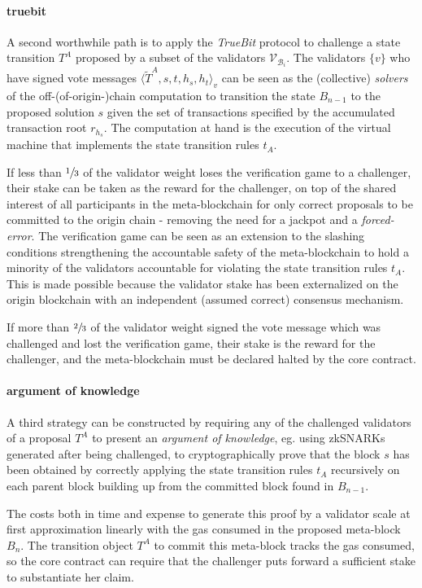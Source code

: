 \documentclass[12pt,a4paper]{article}
\begin{document}
\paragraph{truebit} A second worthwhile path is to apply the \textit{TrueBit}\cite{truebit} protocol to challenge a state transition $T^A$ proposed by a subset of the validators $\mathcal{V}_{\mathcal{B}_i}$.
The validators $\{v\}$ who have signed vote messages $\langle\tilde{T}^A, s, t, h_s, h_t\rangle_v$ can be seen as the (collective) \emph{solvers} of the off-(of-origin-)chain computation to transition the state $B_{n-1}$ to the proposed solution $s$ given the set of transactions specified by the accumulated transaction root $r_{h_s}$.
The computation at hand is the execution of the virtual machine that implements the state transition rules $t_A$.

If less than $\sfrac{1}{3}$ of the validator weight loses the verification game to a challenger, their stake can be taken as the reward for the challenger, on top of the shared interest of all participants in the meta-blockchain for only correct proposals to be committed to the origin chain - removing the need for a jackpot and a \emph{forced-error}.
The verification game can be seen as an extension to the slashing conditions strengthening the accountable safety of the meta-blockchain to hold a minority of the validators accountable for violating the state transition rules $t_A$.
This is made possible because the validator stake has been externalized on the origin blockchain with an independent (assumed correct) consensus mechanism.

If more than $\sfrac{2}{3}$ of the validator weight signed the vote message which was challenged and lost the verification game, their stake is the reward for the challenger, and the meta-blockchain must be declared halted by the core contract.

\paragraph{argument of knowledge} A third strategy can be constructed by requiring any of the challenged validators of a proposal $T^A$ to present an \emph{argument of knowledge}, eg. using \mbox{zkSNARKs} generated after being challenged, to cryptographically prove that the block $s$ has been obtained by correctly applying the state transition rules $t_A$ recursively on each parent block building up from the committed block found in $B_{n-1}$.

The costs both in time and expense to generate this proof by a validator scale at first approximation linearly with the gas consumed in the proposed meta-block $B_n$.
The transition object $T^A$ to commit this meta-block tracks the gas consumed, so the core contract can require that the challenger puts forward a sufficient stake to substantiate her claim.
\end{document}
